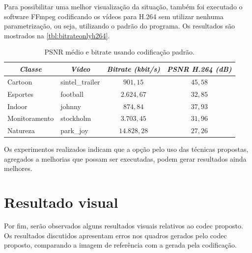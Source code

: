 \documentclass[cic,tc]{iiufrgs}
\begin{document}
Para possibilitar uma melhor visualização da situação, também foi executado o 
software FFmpeg codificando os vídeos para H.264 sem utilizar nenhuma parametrização, 
ou seja, utilizando o padrão do programa.
Os resultados são mostrados na \autoref{tbl:bitrateonlyh264}.

\begin{table}[h]
    \caption{PSNR médio e bitrate usando codificação padrão.}
    \centering
        \begin{tabular}{|l|l|c|c|}
          \hline
          \multicolumn{1}{|c}{\textit{Classe}} & 
          \multicolumn{1}{|c}{\textit{Vídeo}} & 
          \multicolumn{1}{|c|}{\textit{Bitrate (kbit/s)}} &
          \multicolumn{1}{|c|}{\textit{PSNR H.264 (dB)}} \\
          \hline
          \hline
          Cartoon & sintel\_trailer & $901,15$ & $45,58$ \\
          Esportes & football & $2.624,67$ & $32,85$ \\
          Indoor & johnny & $874,84$ & $37,93$ \\
          Monitoramento & stockholm & $3.703,45$ & $31,96$ \\
          Natureza & park\_joy & $14.828,28$ & $27,26$ \\
          \hline
        \end{tabular}
    \label{tbl:bitrateonlyh264}
\end{table}

Os experimentos realizados indicam que a opção pelo uso das técnicas propostas,
agregados a melhorias que possam ser executadas, podem gerar resultados ainda melhores.

\section{Resultado visual}
\label{sec:resultadovisual}
Por fim, serão observados alguns resultados visuais relativos 
ao codec proposto.
Os resultados discutidos apresentam erros nos quadros gerados 
pelo codec proposto,
comparando a imagem de referência com a gerada pela codificação.
\end{document}
